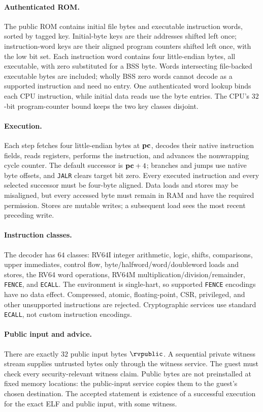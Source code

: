 \paragraph{Authenticated ROM.} The public ROM contains initial file bytes and executable instruction words, sorted by tagged key. Initial-byte keys are their addresses shifted left once; instruction-word keys are their aligned program counters shifted left once, with the low bit set. Each instruction word contains four little-endian bytes, all executable, with zero substituted for a BSS byte. Words intersecting file-backed executable bytes are included; wholly BSS zero words cannot decode as a supported instruction and need no entry. One authenticated word lookup binds each CPU instruction, while initial data reads use the byte entries. The CPU's $32$-bit program-counter bound keeps the two key classes disjoint.

\paragraph{Execution.} Each step fetches four little-endian bytes at $\mathbf{pc}$, decodes their native instruction fields, reads registers, performs the instruction, and advances the nonwrapping cycle counter. The default successor is $\mathbf{pc}+4$; branches and jumps use native byte offsets, and \texttt{JALR} clears target bit zero. Every executed instruction and every selected successor must be four-byte aligned. Data loads and stores may be misaligned, but every accessed byte must remain in RAM and have the required permission. Stores are mutable writes; a subsequent load sees the most recent preceding write.

\paragraph{Instruction classes.} The decoder has $64$ classes: RV64I integer arithmetic, logic, shifts, comparisons, upper immediates, control flow, byte/halfword/word/doubleword loads and stores, the RV64 word operations, RV64M multiplication/division/remainder, \texttt{FENCE}, and \texttt{ECALL}. The environment is single-hart, so supported \texttt{FENCE} encodings have no data effect. Compressed, atomic, floating-point, CSR, privileged, and other unsupported instructions are rejected. Cryptographic services use standard \texttt{ECALL}, not custom instruction encodings.

\paragraph{Public input and advice.} There are exactly $32$ public input bytes $\rvpublic$. A sequential private witness stream supplies untrusted bytes only through the witness service. The guest must check every security-relevant witness claim. Public bytes are not preinstalled at fixed memory locations: the public-input service copies them to the guest's chosen destination. The accepted statement is existence of a successful execution for the exact ELF and public input, with some witness.

